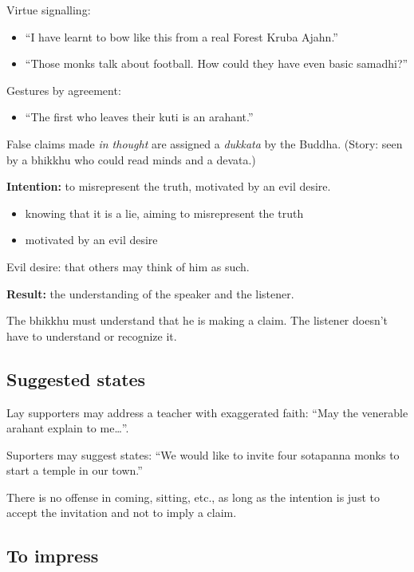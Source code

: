 Virtue signalling:

\begin{itemize}
\tightlist
\item
  ``I have learnt to bow like this from a real Forest Kruba Ajahn.''
\item
  ``Those monks talk about football. How could they have even basic
  samadhi?''
\end{itemize}

Gestures by agreement:

\begin{itemize}
\tightlist
\item
  ``The first who leaves their kuti is an arahant.''
\end{itemize}

False claims made \emph{in thought} are assigned a \emph{dukkata} by the
Buddha. (Story: seen by a bhikkhu who could read minds and a devata.)

\textbf{Intention:} to misrepresent the truth, motivated by an evil
desire.

\begin{itemize}
\tightlist
\item
  knowing that it is a lie, aiming to misrepresent the truth
\item
  motivated by an evil desire
\end{itemize}

Evil desire: that others may think of him as such.

\textbf{Result:} the understanding of the speaker and the listener.

The bhikkhu must understand that he is making a claim. The listener
doesn't have to understand or recognize it.

\subsection{Suggested states}

Lay supporters may address a teacher with exaggerated faith: ``May the
venerable arahant explain to me\ldots{}''.

Suporters may suggest states: ``We would like to invite four sotapanna
monks to start a temple in our town.''

There is no offense in coming, sitting, etc., as long as the intention
is just to accept the invitation and not to imply a claim.

\subsection{To impress}

